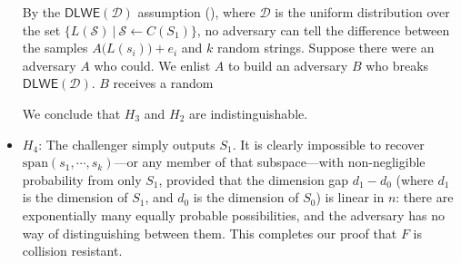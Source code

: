 \documentclass{article}
\begin{document}
\begin{itemize}
By the $\textsf{DLWE}(\mathcal{D})$ assumption (\cite{robustness}), where $\mathcal{D}$ is the uniform distribution over the set $\{L(\mathcal{S}) \:|\: \mathcal{S} \leftarrow C(S_1)\}$, no adversary can tell the difference between the samples $A\big( L(s_i) \big) + e_i$ and $k$ random strings. Suppose there were an adversary $A$ who could. We enlist $A$ to build an adversary $B$ who breaks $\textsf{DLWE}(\mathcal{D})$. $B$ receives a random 

We conclude that $H_3$ and $H_2$ are indistinguishable.
	\item $H_4$: The challenger simply outputs $S_1$. It is clearly impossible to recover $\mathrm{span}(s_1, \cdots, s_k)$---or any member of that subspace---with non-negligible probability from only $S_1$, provided that the dimension gap $d_1 - d_0$ (where $d_1$ is the dimension of $S_1$, and $d_0$ is the dimension of $S_0$) is linear in $n$: there are exponentially many equally probable possibilities, and the adversary has no way of distinguishing between them. This completes our proof that $F$ is collision resistant.
\end{itemize}



\end{document}
